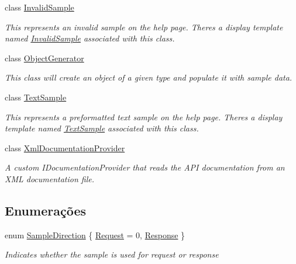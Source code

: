 \begin{DoxyCompactItemize}
class \hyperlink{classApi3Layers_1_1Areas_1_1HelpPage_1_1InvalidSample}{Invalid\+Sample}
\begin{DoxyCompactList}\small\item\em This represents an invalid sample on the help page. There\textquotesingle{}s a display template named \hyperlink{classApi3Layers_1_1Areas_1_1HelpPage_1_1InvalidSample}{Invalid\+Sample} associated with this class. \end{DoxyCompactList}\item 
class \hyperlink{classApi3Layers_1_1Areas_1_1HelpPage_1_1ObjectGenerator}{Object\+Generator}
\begin{DoxyCompactList}\small\item\em This class will create an object of a given type and populate it with sample data. \end{DoxyCompactList}\item 
class \hyperlink{classApi3Layers_1_1Areas_1_1HelpPage_1_1TextSample}{Text\+Sample}
\begin{DoxyCompactList}\small\item\em This represents a preformatted text sample on the help page. There\textquotesingle{}s a display template named \hyperlink{classApi3Layers_1_1Areas_1_1HelpPage_1_1TextSample}{Text\+Sample} associated with this class. \end{DoxyCompactList}\item 
class \hyperlink{classApi3Layers_1_1Areas_1_1HelpPage_1_1XmlDocumentationProvider}{Xml\+Documentation\+Provider}
\begin{DoxyCompactList}\small\item\em A custom I\+Documentation\+Provider that reads the A\+PI documentation from an X\+ML documentation file. \end{DoxyCompactList}\end{DoxyCompactItemize}
\subsection*{Enumerações}
\begin{DoxyCompactItemize}
\item 
enum \hyperlink{namespaceApi3Layers_1_1Areas_1_1HelpPage_abad9f6d2b059d72558bf70415efc32b5}{Sample\+Direction} \{ \hyperlink{namespaceApi3Layers_1_1Areas_1_1HelpPage_abad9f6d2b059d72558bf70415efc32b5a15c2d85f1fae22a3c3a0594510a1f611}{Request} = 0, 
\hyperlink{namespaceApi3Layers_1_1Areas_1_1HelpPage_abad9f6d2b059d72558bf70415efc32b5ad64ed3e9c10229648e069f56e32f4c8e}{Response}
 \}\begin{DoxyCompactList}\small\item\em Indicates whether the sample is used for request or response \end{DoxyCompactList}
\end{DoxyCompactItemize}


